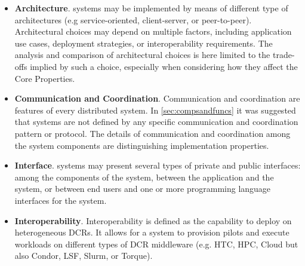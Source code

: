 \documentclass{sig-alternate}
\begin{document}
\begin{itemize}

\item \textbf{Architecture}. \pilot systems may be implemented by means of
  different type of architectures (e.g service-oriented, client-server, or
  peer-to-peer). Architectural choices may depend on multiple factors,
  including application use cases, deployment strategies, or interoperability
  requirements.  The analysis and comparison of architectural choices is here
  limited to the trade-offs implied by such a choice, especially when
  considering how they affect the Core Properties.

\item \textbf{Communication and Coordination}. Communication and coordination
  are features of every distributed system. In \ref{sec:compsandfuncs} it was
  suggested that \pilot systems are not defined by any specific communication
  and coordination pattern or protocol. The details of communication and
  coordination among the \pilot system components are distinguishing
  implementation properties.


\item \textbf{Interface}. \pilot systems may present several types of private
  and public interfaces: among the components of the \pilot system, between the
  application and the \pilot system, or between end users and one or more
  programming language interfaces for the \pilot system.

\item \textbf{Interoperability}. Interoperability is defined as the capability
  to deploy \pilots on heterogeneous DCRs. It allows for a \pilot
  system to provision pilots and execute workloads on different types of
  DCR middleware (e.g. HTC, HPC, Cloud but also Condor, LSF, Slurm, or Torque).


\end{itemize}
\end{document}

